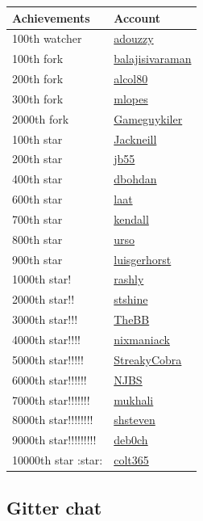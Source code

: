 \documentclass[11pt]{article}
\begin{document}
\begin{center}
\begin{tabular}{ll}
Achievements & Account\\
\hline
100th watcher & \href{https://github.com/adouzzy}{adouzzy}\\
100th fork & \href{https://github.com/balajisivaraman}{balajisivaraman}\\
200th fork & \href{https://github.com/alcol80}{alcol80}\\
300th fork & \href{https://github.com/mlopes}{mlopes}\\
2000th fork & \href{https://github.com/Gameguykiler}{Gameguykiler}\\
100th star & \href{https://github.com/Jackneill}{Jackneill}\\
200th star & \href{https://github.com/jb55}{jb55}\\
400th star & \href{https://github.com/dbohdan}{dbohdan}\\
600th star & \href{https://github.com/laat}{laat}\\
700th star & \href{https://github.com/kendall}{kendall}\\
800th star & \href{https://github.com/urso}{urso}\\
900th star & \href{https://github.com/luisgerhorst}{luisgerhorst}\\
1000th star! & \href{https://github.com/rashly}{rashly}\\
2000th star!! & \href{https://github.com/stshine}{stshine}\\
3000th star!!! & \href{https://github.com/TheBB}{TheBB}\\
4000th star!!!! & \href{https://github.com/nixmaniack}{nixmaniack}\\
5000th star!!!!! & \href{https://github.com/StreakyCobra}{StreakyCobra}\\
6000th star!!!!!! & \href{https://github.com/NJBS}{NJBS}\\
7000th star!!!!!!! & \href{https://github.com/mukhali}{mukhali}\\
8000th star!!!!!!!! & \href{https://github.com/shsteven}{shsteven}\\
9000th star!!!!!!!!! & \href{https://github.com/deb0ch}{deb0ch}\\
10000th star :star: & \href{https://github.com/colt365}{colt365}\\
\end{tabular}
\end{center}

\subsection{Gitter chat}
\label{sec:org317bdec}
\end{document}
